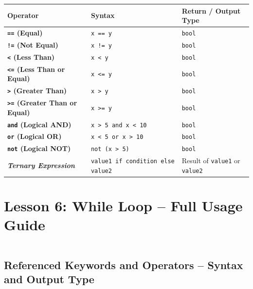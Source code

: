 \documentclass[a4paper,11pt]{article}
\begin{document}
	\begin{tabular}{>{\bfseries}p{4cm} p{7.5cm} p{3cm}}
		\toprule
		Operator & Syntax & Return / Output Type \\
		\midrule
		
		\texttt{==} (Equal) & \texttt{x == y} & \texttt{bool} \\
		
		\texttt{!=} (Not Equal) & \texttt{x != y} & \texttt{bool} \\
		
		\texttt{<} (Less Than) & \texttt{x < y} & \texttt{bool} \\
		
		\texttt{<=} (Less Than or Equal) & \texttt{x <= y} & \texttt{bool} \\
		
		\texttt{>} (Greater Than) & \texttt{x > y} & \texttt{bool} \\
		
		\texttt{>=} (Greater Than or Equal) & \texttt{x >= y} & \texttt{bool} \\
		
		\texttt{and} (Logical AND) & \texttt{x > 5 and x < 10} & \texttt{bool} \\
		
		\texttt{or} (Logical OR) & \texttt{x < 5 or x > 10} & \texttt{bool} \\
		
		\texttt{not} (Logical NOT) & \texttt{not (x > 5)} & \texttt{bool} \\
		
		\textit{Ternary Expression} & \texttt{value1 if condition else value2} & Result of \texttt{value1} or \texttt{value2} \\
		\bottomrule
	\end{tabular}
	
	\section{Lesson 6: While Loop – Full Usage Guide}
	\inputminted{python}{Python_Files/while_loop_guid.py}
	
	
	\vspace{1em}
	\subsection*{Referenced Keywords and Operators – Syntax and Output Type}
	
\end{document}
